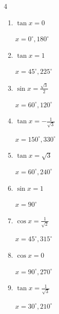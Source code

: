 \begin{multicols}{4}
\begin{enumerate}
        $\displaystyle x = 45^{\circ} , 225^{\circ}$

  \item $\displaystyle \tan{x}  = 0$

        $\displaystyle x = 0^{\circ} , 180^{\circ}$

  \item $\displaystyle \tan{x}  = 1$

        $\displaystyle x = 45^{\circ} , 225^{\circ}$

  \item $\displaystyle \sin{x}  = \frac{\sqrt{3}}{2}$

        $\displaystyle x = 60^{\circ} , 120^{\circ}$

  \item $\displaystyle \tan{x}  = -\frac{1}{\sqrt{3}}$

        $\displaystyle x = 150^{\circ} , 330^{\circ}$

  \item $\displaystyle \tan{x}  = \sqrt{3}$

        $\displaystyle x = 60^{\circ} , 240^{\circ}$

  \item $\displaystyle \sin{x}  = 1$

        $\displaystyle x = 90^{\circ}$

  \item $\displaystyle \cos{x}  = \frac{1}{\sqrt{2}}$

        $\displaystyle x = 45^{\circ} , 315^{\circ}$

  \item $\displaystyle \cos{x}  = 0$

        $\displaystyle x = 90^{\circ} , 270^{\circ}$

  \item $\displaystyle \tan{x}  = \frac{1}{\sqrt{3}}$

        $\displaystyle x = 30^{\circ} , 210^{\circ}$

\end{enumerate}
\end{multicols}

